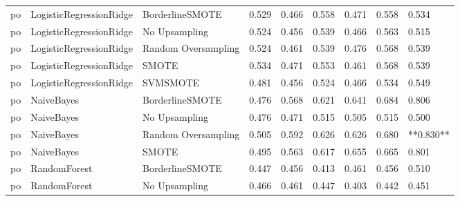 \begin{tabular}{lllllllll}
      po &      LogisticRegressionRidge &     BorderlineSMOTE & 0.529 &                     0.466 &                 0.558 &                  0.471 &                                   0.558 &     0.534 \\
      po &      LogisticRegressionRidge &       No Upsampling & 0.524 &                     0.456 &                 0.539 &                  0.466 &                                   0.563 &     0.515 \\
      po &      LogisticRegressionRidge & Random Oversampling & 0.524 &                     0.461 &                 0.539 &                  0.476 &                                   0.568 &     0.539 \\
      po &      LogisticRegressionRidge &               SMOTE & 0.534 &                     0.471 &                 0.553 &                  0.461 &                                   0.568 &     0.539 \\
      po &      LogisticRegressionRidge &            SVMSMOTE & 0.481 &                     0.456 &                 0.524 &                  0.466 &                                   0.534 &     0.549 \\
      po &                   NaiveBayes &     BorderlineSMOTE & 0.476 &                     0.568 &                 0.621 &                  0.641 &                                   0.684 &     0.806 \\
      po &                   NaiveBayes &       No Upsampling & 0.476 &                     0.471 &                 0.515 &                  0.505 &                                   0.515 &     0.500 \\
      po &                   NaiveBayes & Random Oversampling & 0.505 &                     0.592 &                 0.626 &                  0.626 &                                   0.680 & **0.830** \\
      po &                   NaiveBayes &               SMOTE & 0.495 &                     0.563 &                 0.617 &                  0.655 &                                   0.665 &     0.801 \\
      po &                 RandomForest &     BorderlineSMOTE & 0.447 &                     0.456 &                 0.413 &                  0.461 &                                   0.456 &     0.510 \\
      po &                 RandomForest &       No Upsampling & 0.466 &                     0.461 &                 0.447 &                  0.403 &                                   0.442 &     0.451 \\

\end{tabular}
